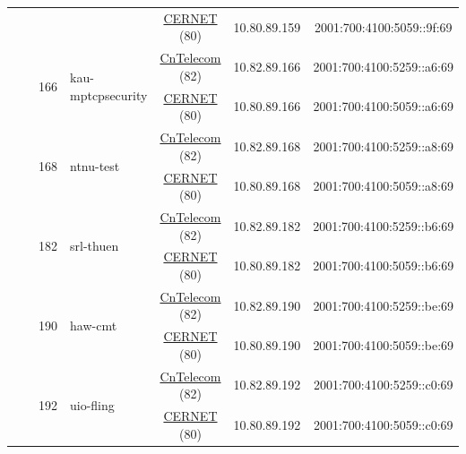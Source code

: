 \begin{small}
\begin{center}
\begin{longtable}{|c|c|c|c|c|c|c|c|}
  &  &  &  & \multicolumn{2}{|c|}{\tiny{\href{http://www.cernet.edu.cn}{CERNET} (80)}} & \tiny{10.80.89.159} & \tiny{2001:700:4100:5059::9f:69} \\* \cline{3-3}\cline{4-4}\cline{5-5}\cline{6-6}\cline{7-7}\cline{8-8}
  &  & \multirow{2}{*}{\tiny{166}} & \multicolumn{1}{|l|}{\multirow{2}{*}{\tiny{kau-mptcpsecurity}}} & \multicolumn{2}{|c|}{\tiny{\href{http://www.chinatelecom.com.cn}{CnTelecom} (82)}} & \tiny{10.82.89.166} & \tiny{2001:700:4100:5259::a6:69} \\* \cline{5-5}\cline{6-6}\cline{7-7}\cline{8-8}
  &  &  &  & \multicolumn{2}{|c|}{\tiny{\href{http://www.cernet.edu.cn}{CERNET} (80)}} & \tiny{10.80.89.166} & \tiny{2001:700:4100:5059::a6:69} \\* \cline{3-3}\cline{4-4}\cline{5-5}\cline{6-6}\cline{7-7}\cline{8-8}
  &  & \multirow{2}{*}{\tiny{168}} & \multicolumn{1}{|l|}{\multirow{2}{*}{\tiny{ntnu-test}}} & \multicolumn{2}{|c|}{\tiny{\href{http://www.chinatelecom.com.cn}{CnTelecom} (82)}} & \tiny{10.82.89.168} & \tiny{2001:700:4100:5259::a8:69} \\* \cline{5-5}\cline{6-6}\cline{7-7}\cline{8-8}
  &  &  &  & \multicolumn{2}{|c|}{\tiny{\href{http://www.cernet.edu.cn}{CERNET} (80)}} & \tiny{10.80.89.168} & \tiny{2001:700:4100:5059::a8:69} \\* \cline{3-3}\cline{4-4}\cline{5-5}\cline{6-6}\cline{7-7}\cline{8-8}
  &  & \multirow{2}{*}{\tiny{182}} & \multicolumn{1}{|l|}{\multirow{2}{*}{\tiny{srl-thuen}}} & \multicolumn{2}{|c|}{\tiny{\href{http://www.chinatelecom.com.cn}{CnTelecom} (82)}} & \tiny{10.82.89.182} & \tiny{2001:700:4100:5259::b6:69} \\* \cline{5-5}\cline{6-6}\cline{7-7}\cline{8-8}
  &  &  &  & \multicolumn{2}{|c|}{\tiny{\href{http://www.cernet.edu.cn}{CERNET} (80)}} & \tiny{10.80.89.182} & \tiny{2001:700:4100:5059::b6:69} \\* \cline{3-3}\cline{4-4}\cline{5-5}\cline{6-6}\cline{7-7}\cline{8-8}
  &  & \multirow{2}{*}{\tiny{190}} & \multicolumn{1}{|l|}{\multirow{2}{*}{\tiny{haw-cmt}}} & \multicolumn{2}{|c|}{\tiny{\href{http://www.chinatelecom.com.cn}{CnTelecom} (82)}} & \tiny{10.82.89.190} & \tiny{2001:700:4100:5259::be:69} \\* \cline{5-5}\cline{6-6}\cline{7-7}\cline{8-8}
  &  &  &  & \multicolumn{2}{|c|}{\tiny{\href{http://www.cernet.edu.cn}{CERNET} (80)}} & \tiny{10.80.89.190} & \tiny{2001:700:4100:5059::be:69} \\* \cline{3-3}\cline{4-4}\cline{5-5}\cline{6-6}\cline{7-7}\cline{8-8}
  &  & \multirow{2}{*}{\tiny{192}} & \multicolumn{1}{|l|}{\multirow{2}{*}{\tiny{uio-fling}}} & \multicolumn{2}{|c|}{\tiny{\href{http://www.chinatelecom.com.cn}{CnTelecom} (82)}} & \tiny{10.82.89.192} & \tiny{2001:700:4100:5259::c0:69} \\* \cline{5-5}\cline{6-6}\cline{7-7}\cline{8-8}
  &  &  &  & \multicolumn{2}{|c|}{\tiny{\href{http://www.cernet.edu.cn}{CERNET} (80)}} & \tiny{10.80.89.192} & \tiny{2001:700:4100:5059::c0:69} \\ \hline
\end{longtable}
\end{center}
\end{small}
